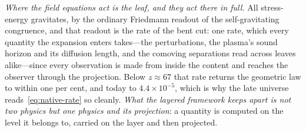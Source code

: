 \documentclass[11pt,a4paper]{article}
\theoremstyle{plain}
\theoremstyle{definition}
\theoremstyle{remark}
\begin{document}
\emph{Where the field equations act is the leaf, and they act there in full.} All stress-energy gravitates, by the ordinary Friedmann readout of the self-gravitating congruence, and that readout is the rate of the bent cut: one rate, which every quantity the expansion enters takes---the perturbations, the plasma's sound horizon and its diffusion length, and the comoving separations read across leaves alike---since every observation is made from inside the content and reaches the observer through the projection. Below $z\approx67$ that rate returns the geometric law to within one per cent, and today to $4.4\times10^{-5}$, which is why the late universe reads~\eqref{eq:native-rate} so cleanly. \emph{What the layered framework keeps apart is not two physics but one physics and its projection}: a quantity is computed on the level it belongs to, carried on the layer and then projected.
\end{document}
